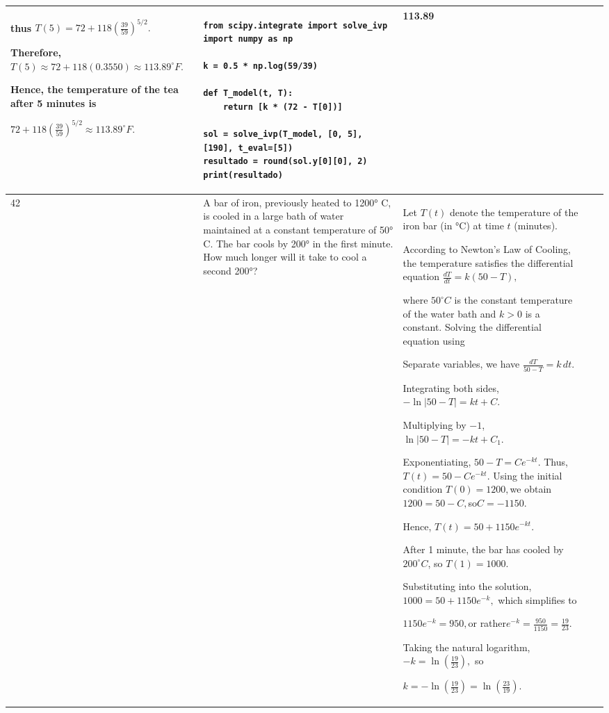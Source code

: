 \documentclass[a4paper,12pt]{article}
\begin{document}
\begin{longtable}{|p{0.3cm}|p{}|p{10cm}|p{}|p{1.5cm}|}
thus $T(5)=72+118\left(\frac{39}{59}\right)^{5/2}.$

Therefore, $T(5)\approx72+118(0.3550)\approx113.89^\circ F.$

Hence, the temperature of the tea after 5 minutes is

$
72+118\left(\frac{39}{59}\right)^{5/2}\approx113.89^\circ F.
$
               &\begin{verbatim}
from scipy.integrate import solve_ivp
import numpy as np

k = 0.5 * np.log(59/39)

def T_model(t, T):
    return [k * (72 - T[0])]

sol = solve_ivp(T_model, [0, 5], [190], t_eval=[5])
resultado = round(sol.y[0][0], 2)
print(resultado)
\end{verbatim} & 113.89  \\ \hline    
42            & A bar of iron, previously heated to 1200° C, is cooled in a large bath of water maintained at a constant temperature
of 50° C. The bar cools by 200° in the first minute. How much longer will it take to cool a second 200°?


              & Let $T(t)$ denote the temperature of the iron bar (in °C) at time $t$ (minutes).

According to Newton's Law of Cooling, the temperature satisfies the differential equation  $\frac{dT}{dt}=k(50-T),$

where $50^\circ C$ is the constant temperature of the water bath and $k>0$ is a constant. Solving the differential equation using

Separate variables, we have $\frac{dT}{50-T}=k\,dt.$

Integrating both sides, $-\ln|50-T|=kt+C.$

Multiplying by $-1$, $\ln|50-T|=-kt+C_1.$

Exponentiating, $50-T=Ce^{-kt}.$ Thus, $T(t)=50-Ce^{-kt}.$ Using the initial condition $T(0)=1200,$we obtain $1200=50-C,$so$C=-1150.$

Hence, $T(t)=50+1150e^{-kt}.$

After 1 minute, the bar has cooled by $200^\circ C$, so $T(1)=1000.$

Substituting into the solution, $1000=50+1150e^{-k},$ which simplifies to

$1150e^{-k}=950,$or rather$e^{-k}=\frac{950}{1150}=\frac{19}{23}.$

Taking the natural logarithm, $-k=\ln\left(\frac{19}{23}\right),$ so

$k=-\ln\left(\frac{19}{23}\right)=\ln\left(\frac{23}{19}\right).$


\end{longtable}
\end{document}
